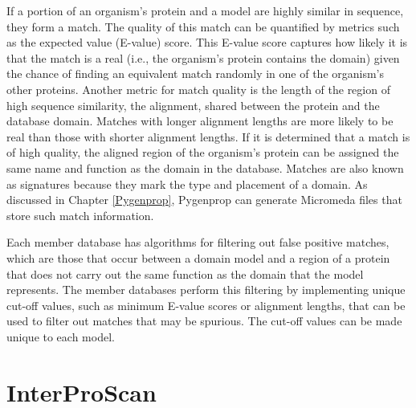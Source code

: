 If a portion of an organism's protein and a model are highly similar in sequence, they form a match. The quality of this match can be quantified by metrics such as the expected value (E-value) score. This E-value score captures how likely it is that the match is a real (i.e., the organism's protein contains the domain) given the chance of finding an equivalent match randomly in one of the organism's other proteins. Another metric for match quality is the length of the region of high sequence similarity, the alignment, shared between the protein and the database domain. Matches with longer alignment lengths are more likely to be real than those with shorter alignment lengths. If it is determined that a match is of high quality, the aligned region of the organism's protein can be assigned the same name and function as the domain in the database. Matches are also known as signatures because they mark the type and placement of a domain. As discussed in Chapter \ref{Pygenprop}, Pygenprop can generate Micromeda files that store such match information.

Each member database has algorithms for filtering out false positive matches, which are those that occur between a domain model and a region of a protein that does not carry out the same function as the domain that the model represents. The member databases perform this filtering by implementing unique cut-off values, such as minimum E-value scores or alignment lengths, that can be used to filter out matches that may be spurious. The cut-off values can be made unique to each model. 

\section{InterProScan} \label{overview-interproscan}

